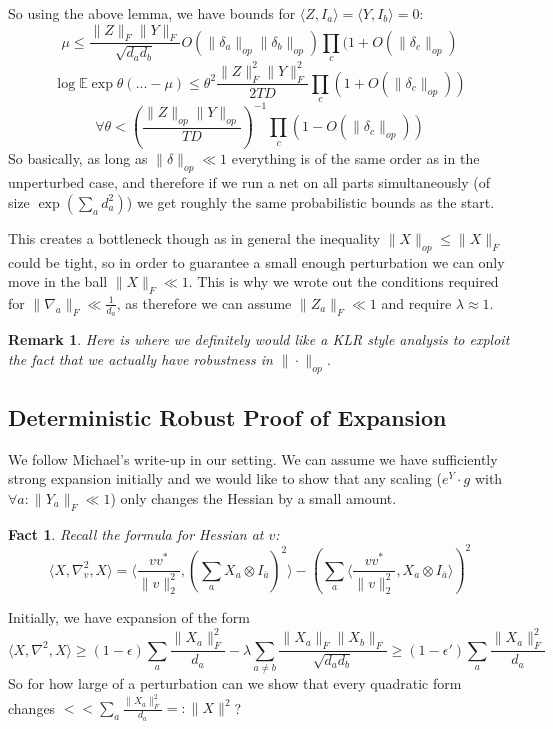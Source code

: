 \documentclass{article}
\newtheorem{fact}[theorem]{Fact}
\newtheorem{remark}{Remark}
\newcommand{\E}{\mathbb{E}}
\begin{document}
So using the above lemma, we have bounds for $\langle Z, I_{a} \rangle = \langle Y, I_{b} \rangle = 0$:
\[ \mu \leq \frac{\|Z\|_{F} \|Y\|_{F}}{\sqrt{d_{a} d_{b}}} O(\|\delta_{a}\|_{op} \|\delta_{b}\|_{op}) \prod_{c} (1 + O(\|\delta_{c}\|_{op})  \]
\[ \log \E \exp \theta (... - \mu) \leq \theta^{2} \frac{\|Z\|_{F}^{2} \|Y\|_{F}^{2}}{2TD} \prod_{c} (1 + O(\|\delta_{c}\|_{op}))  \]
\[ \forall \theta < \left( \frac{\|Z\|_{op}\|Y\|_{op}}{TD} \right)^{-1} \prod_{c} (1 - O(\|\delta_{c}\|_{op}))  \]
So basically, as long as $\|\delta\|_{op} \ll 1$ everything is of the same order as in the unperturbed case, and therefore if we run a net on all parts simultaneously (of size $\exp(\sum_{a} d_{a}^{2})$) we get roughly the same probabilistic bounds as the start.

This creates a bottleneck though as in general the inequality $\|X\|_{op} \leq \|X\|_{F}$ could be tight, so in order to guarantee a small enough perturbation we can only move in the ball $\|X\|_{F} \ll 1$. This is why we wrote out the conditions required for $\|\nabla_{a}\|_{F} \ll \frac{1}{d_{a}}$, as therefore we can assume $\|Z_{a}\|_{F} \ll 1$ and require $\lambda \approx 1$.

\begin{remark}
Here is where we definitely would like a KLR style analysis to exploit the fact that we actually have robustness in $\|\cdot\|_{op}$.
\end{remark}


\subsection{Deterministic Robust Proof of Expansion}

We follow Michael's write-up in our setting. We can assume we have sufficiently strong expansion initially and we would like to show that any scaling ($e^{Y} \cdot g$ with $\forall a: \|Y_{a}\|_{F} \ll 1$) only changes the Hessian by a small amount.
\begin{fact}
Recall the formula for Hessian at $v$:
\[ \langle X, \nabla_{v}^{2}, X \rangle = \langle \frac{v v^{*}}{\|v\|_{2}^{2}}, \left( \sum_{a} X_{a} \otimes I_{\overline{a}}  \right)^{2} \rangle - \left( \sum_{a} \langle \frac{v v^{*}}{\|v\|_{2}^{2}}, X_{a} \otimes I_{\overline{a}} \rangle  \right)^{2}  \]
\end{fact}

Initially, we have expansion of the form
\[ \langle X, \nabla^{2}, X \rangle \geq (1-\epsilon) \sum_{a} \frac{\|X_{a}\|_{F}^{2}}{d_{a}} - \lambda \sum_{a \neq b} \frac{\|X_{a}\|_{F} \|X_{b}\|_{F}}{\sqrt{d_{a} d_{b}}} \geq (1-\epsilon') \sum_{a} \frac{\|X_{a}\|_{F}^{2}}{d_{a}}   \]
So for how large of a perturbation can we show that every quadratic form changes $<< \sum_{a} \frac{\|X_{a}\|_{F}^{2}}{d_{a}} =: \|X\|^{2}$?
\end{document}
